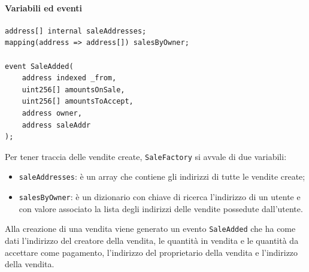 \documentclass[a4paper]{article}
\begin{document}
        \paragraph{Variabili ed eventi}
\begin{lstlisting}[style=ES6, title={Variabili ed eventi di SaleFactory}]
address[] internal saleAddresses;
mapping(address => address[]) salesByOwner;

event SaleAdded(
    address indexed _from,
    uint256[] amountsOnSale,
    uint256[] amountsToAccept,
    address owner,
    address saleAddr
);
\end{lstlisting}
        Per tener traccia delle vendite create, \verb|SaleFactory| si avvale di due variabili:
        \begin{itemize}
          \item \verb|saleAddresses|: è un array che contiene gli indirizzi di tutte le vendite create;
          \item \verb|salesByOwner|: è un dizionario con chiave di ricerca l'indirizzo di un utente e con valore associato la lista degli indirizzi delle vendite possedute dall'utente.
        \end{itemize}
        Alla creazione di una vendita viene generato un evento \verb|SaleAdded| che ha come dati l'indirizzo del creatore della vendita, le quantità in vendita e le quantità da accettare come pagamento, l'indirizzo del proprietario della vendita e l'indirizzo della vendita.
\end{document}
